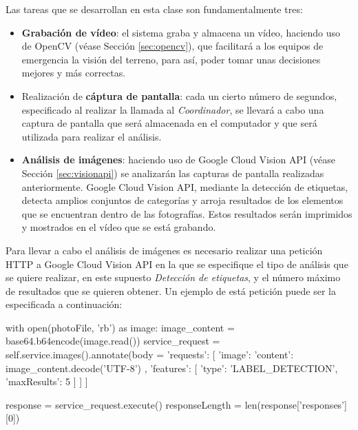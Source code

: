 Las tareas que se desarrollan en esta clase son fundamentalmente tres:
\begin{itemize}
\item \textbf{Grabación de vídeo}: el sistema graba y almacena un vídeo, haciendo uso de OpenCV (véase Sección \ref{sec:opencv}), que facilitará a los equipos de emergencia la visión del terreno, para así, poder tomar unas decisiones mejores y más correctas.
\item Realización de \textbf{cáptura de pantalla}: cada un cierto número de segundos, especificado al realizar la llamada al \textit{Coordinador}, se llevará a cabo una captura de pantalla que será almacenada en el computador y que será utilizada para realizar el análisis.
\item \textbf{Análisis de imágenes}: haciendo uso de Google Cloud Vision \acs{API} (véase Sección \ref{sec:visionapi}) se analizarán las capturas de pantalla realizadas anteriormente. Google Cloud Vision \acs{API}, mediante la detección de etiquetas, detecta amplios conjuntos de categorías y arroja resultados de los elementos que se encuentran dentro de las fotografías. Estos resultados serán imprimidos y mostrados en el vídeo que se está grabando.
\end{itemize}

\clearpage

Para llevar a cabo el análisis de imágenes es necesario realizar una petición HTTP a Google Cloud Vision \acs{API} en la que se especifique el tipo de análisis que se quiere realizar, en este supuesto \textit{Detección de etiquetas}, y el número máximo de resultados que se quieren obtener. Un ejemplo de está petición puede ser la especificada a continuación:

\begin{listing}[
  float=h!,
  language = Python,
  caption  = {Ejemplo de petición a Google Cloud Vision \acs{API} para la detección de etiquetas},
  label    = code:analisis]
with open(photoFile, 'rb') as image:
	image_content = base64.b64encode(image.read())
        service_request = self.service.images().annotate(body = {
        	'requests': [{
                	'image': {
                    		'content': image_content.decode('UTF-8')
                			},
                		'features': [{
                    			'type': 'LABEL_DETECTION',
                    			'maxResults': 5
                		}]
            	}]
        }]
        
		
        response = service_request.execute()
	responseLength = len(response['responses'][0])
\end{listing}


